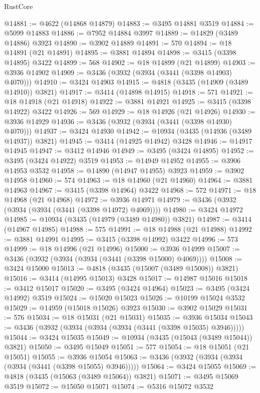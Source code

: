 \begin{lexlean}{RustCore}
\begin{coremodule}
@14881 := @4622 (@14868 @14879)
@14883 := @3495 @14881 @3519
@14884 := @5099 @14883
@14886 := @7952 @14884 @3997
@14889 := @14829 (@3489 @14886) @3923
@14890 := @3902 @14889
@14891 := 570
@14894 := @18 @14891 (@21 @14891)
@14895 := @3881 @14894
@14898 := @3415 (@3398 @14895) @3422
@14899 := 568
@14902 := @18 @14899 (@21 @14899)
@14903 := @3936 @14902
@14909 := @3436 (@3932 (@3934 (@3441 (@3398 @14903) @4070)))
@14910 := @3424 @14903
@14915 := @4818 (@3435 (@14909 (@3489 @14910)) @3821)
@14917 := @3414 (@14898 @14915)
@14918 := 571
@14921 := @18 @14918 (@21 @14918)
@14922 := @3881 @14921
@14925 := @3415 (@3398 @14922) @3422
@14926 := 569
@14929 := @18 @14926 (@21 @14926)
@14930 := @3936 @14929
@14936 := @3436 (@3932 (@3934 (@3441 (@3398 @14930) @4070)))
@14937 := @3424 @14930
@14942 := @10934 (@3435 (@14936 (@3489 @14937)) @3821)
@14945 := @3414 (@14925 @14942) @3428
@14946 := @14917 @14945
@14947 := @3412 @14946
@14949 := @3495 (@3424 @14895)
@14952 := @3495 (@3424 @14922) @3519
@14953 := @14949 @14952
@14955 := @3906 @14953 @3532
@14958 := @14890 (@14947 @14955) @3923
@14959 := @3902 @14958
@14960 := 574
@14963 := @18 @14960 (@21 @14960)
@14964 := @3881 @14963
@14967 := @3415 (@3398 @14964) @3422
@14968 := 572
@14971 := @18 @14968 (@21 @14968)
@14972 := @3936 @14971
@14979 := @3436 (@3932 (@3934 (@3934 (@3441 (@3398 @14972) @4069))))
@14980 := @3424 @14972
@14985 := @10934 (@3435 (@14979 (@3489 @14980)) @3821)
@14987 := @3414 (@14967 @14985)
@14988 := 575
@14991 := @18 @14988 (@21 @14988)
@14992 := @3881 @14991
@14995 := @3415 (@3398 @14992) @3422
@14996 := 573
@14999 := @18 @14996 (@21 @14996)
@15000 := @3936 @14999
@15007 := @3436 (@3932 (@3934 (@3934 (@3441 (@3398 @15000) @4069))))
@15008 := @3424 @15000
@15013 := @4818 (@3435 (@15007 (@3489 @15008)) @3821)
@15016 := @3414 (@14995 @15013) @3428
@15017 := @14987 @15016
@15018 := @3412 @15017
@15020 := @3495 (@3424 @14964)
@15023 := @3495 (@3424 @14992) @3519
@15024 := @15020 @15023
@15026 := @10199 @15024 @3532
@15029 := @14959 (@15018 @15026) @3923
@15030 := @3902 @15029
@15031 := 576
@15034 := @18 @15031 (@21 @15031)
@15035 := @3936 @15034
@15043 := @3436 (@3932 (@3934 (@3934 (@3934 (@3441 (@3398 @15035) @3946)))))
@15044 := @3424 @15035
@15049 := @10934 (@3435 (@15043 (@3489 @15044)) @3821)
@15050 := @3495 @15049
@15051 := 577
@15054 := @18 @15051 (@21 @15051)
@15055 := @3936 @15054
@15063 := @3436 (@3932 (@3934 (@3934 (@3934 (@3441 (@3398 @15055) @3946)))))
@15064 := @3424 @15055
@15069 := @4818 (@3435 (@15063 (@3489 @15064)) @3821)
@15071 := @3495 @15069 @3519
@15072 := @15050 @15071
@15074 := @5316 @15072 @3532

\end{coremodule}
\end{lexlean}
